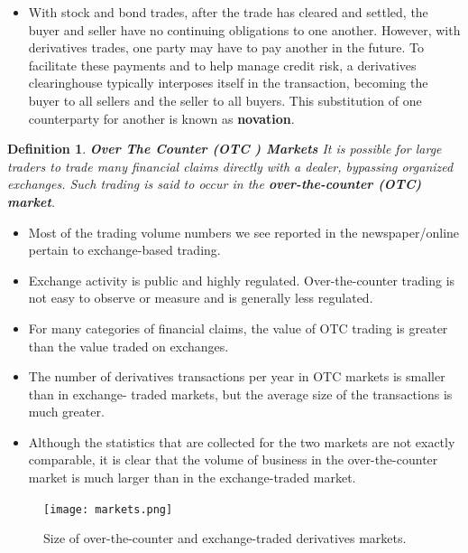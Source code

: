 \documentclass[letterpaper,10pt]{article}
\newtheorem{df}{Definition}[section]
\begin{document}
\begin{itemize}
\item With stock and bond trades, after the trade has cleared and settled, the buyer and seller have no continuing obligations to one another. However, with derivatives trades, one party may have to pay another in the future. To facilitate these payments and to help manage credit risk, a derivatives clearinghouse typically interposes itself in the transaction, becoming the buyer to all sellers and the seller to all buyers. This substitution of one counterparty for another is known as {\bf novation}.


\end{itemize}

\begin{df}{\bf Over The Counter (OTC ) Markets}
It is possible for large traders to trade many financial claims directly with a dealer, bypassing organized exchanges. Such trading is said to occur in the {\bf over-the-counter (OTC) market}.
\end{df}

\begin{itemize}

\item Most of the trading volume numbers we see reported in the newspaper/online pertain to exchange-based trading. 

\item Exchange activity is public and highly regulated. Over-the-counter trading is not easy to observe or measure and is generally less regulated. 

\item For many categories of financial claims, the value of OTC trading is greater than the value traded on exchanges.

\item The number of derivatives transactions per year in OTC markets is smaller than in exchange- traded markets, but the average size of the transactions is much greater. 

\item Although the statistics that are collected for the two markets are not exactly comparable, it is clear that the volume of business in the over-the-counter market is much larger than in the exchange-traded market. 

\end{itemize}


\begin{figure}[ht]
\begin{center}
\texttt{[image: markets.png]}
\caption{Size of over-the-counter and exchange-traded derivatives markets.}
\end{center}
\end{figure}
\end{document}
